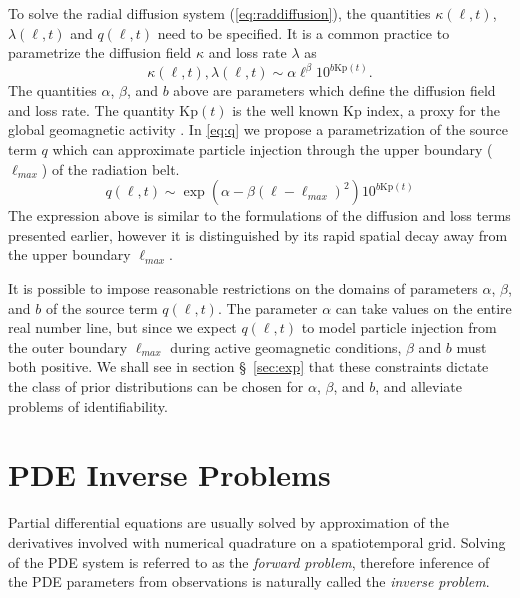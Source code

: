 To solve the radial diffusion system (\cref{eq:raddiffusion}), the quantities $\kappa(\ell, t)$, 
$\lambda(\ell, t)$ and $q(\ell, t)$ need to be specified. It is a common practice 
\citetext{see \citealp{GRL:GRL10762}, \citealp{JGRA:JGRA15067}, \citealp{JGRA:JGRA18021} and
\citealp{GRL:GRL22815}} to parametrize the diffusion field $\kappa$ and loss rate $\lambda$ as 
%
\begin{equation}\label{eq:paramExp}
  \kappa(\ell, t), \lambda(\ell, t) \sim \alpha \ell^{\beta} 10^{b \mathrm{Kp}(t)}.
\end{equation}
%
The quantities $\alpha$, $\beta$, and $b$ above are parameters which define the diffusion field and 
loss rate. The quantity $\mathrm{Kp}(t)$ is the well known Kp index, a proxy for the global 
geomagnetic activity \citep{BartelsKp}.
%
In \cref{eq:q} we propose a parametrization of the source term $q$ which can approximate particle 
injection through the upper boundary ($\ell_{max}$) of the radiation belt. 
%
\begin{equation}\label{eq:q}
q(\ell,t)  \sim \exp(\alpha - \beta (\ell - \ell_{max})^2) 10^{b \mathrm{Kp}(t)}
\end{equation}
%
The expression above is similar to the formulations of the diffusion and loss terms presented 
earlier, however it is distinguished by its rapid spatial decay away from the upper boundary 
$\ell_{max}$.  

It is possible to impose reasonable restrictions on the domains of parameters $\alpha$, $\beta$, 
and $b$ of the source term $q(\ell, t)$. The parameter $\alpha$ can take values on the entire 
real number line, but since we expect $q(\ell, t)$ to model particle injection from the outer 
boundary $\ell_{max}$ during active geomagnetic conditions, $\beta$ and $b$ must both positive. We 
shall see in section \S~\ref{sec:exp} that these constraints dictate the class of prior 
distributions can be chosen for $\alpha$, $\beta$, and $b$, and alleviate problems of 
identifiability.

\section{PDE Inverse Problems}\label{sec:inv}

Partial differential equations are usually solved by approximation of the derivatives involved 
with numerical quadrature on a spatiotemporal grid. Solving of the PDE system is referred to as the 
\emph{forward problem}, therefore inference of the PDE parameters from observations is naturally 
called the \emph{inverse problem}.

